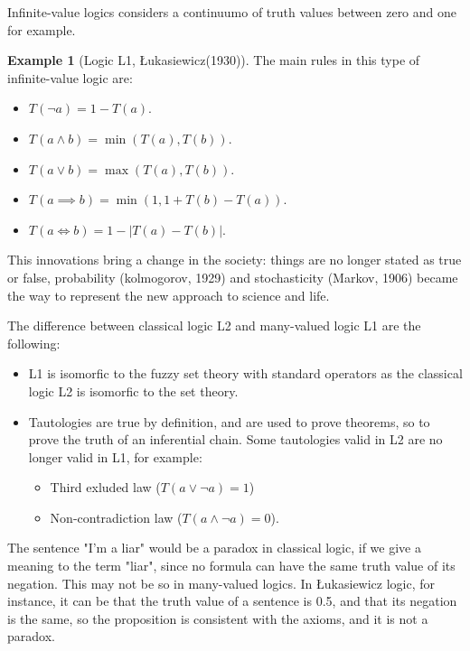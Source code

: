 \documentclass[12pt, a4paper]{report}
\theoremstyle{remark}
\theoremstyle{definition}
\newtheorem{example}{Example}
\begin{document}
    Infinite-value logics considers a continuumo of truth values between zero and one for example. 

    \begin{example}[Logic L1, Łukasiewicz(1930)]
        The main rules in this type of infinite-value logic are: 
        \begin{itemize}
            \item $T(\lnot a)=1-T(a)$.
            \item $T(a \land b)=\min (T(a),T(b))$.
            \item $T(a \lor b)=\max (T(a),T(b))$.
            \item $T(a \implies b)=\min (1, 1+T(b)-T(a))$.
            \item $T(a \Leftrightarrow b)=1-\left\lvert T(a)-T(b) \right\rvert$.
        \end{itemize}
    \end{example}

    This innovations bring a change in the society: things are no longer stated as true or false, probability (kolmogorov, 1929) and 
    stochasticity (Markov, 1906) became the way to represent the new approach to science and life. 

    The difference between classical logic L2 and many-valued logic L1 are the following: 
    \begin{itemize}
        \item L1 is isomorfic to the fuzzy set theory with standard operators as the classical logic L2 is isomorfic to the set theory.
        \item Tautologies are true by definition, and are used to prove theorems, so to prove the truth of an inferential chain. 
            Some tautologies valid in L2 are no longer valid in L1, for example:
            \begin{itemize}
                \item Third exluded law ($T(a \lor \lnot a)=1$)
                \item Non-contradiction law ($T(a \land \lnot a)=0$).
            \end{itemize}
    \end{itemize}

    The sentence "I'm a liar" would be a paradox in classical logic, if we give a meaning to the term "liar", since no formula can have the
    same truth value of its negation. This may not be so in many-valued logics. In Łukasiewicz logic, for instance, it can be that the truth 
    value of a sentence is 0.5, and that its negation is the same, so the proposition is consistent with the axioms, and it is not a paradox. 
\end{document}
